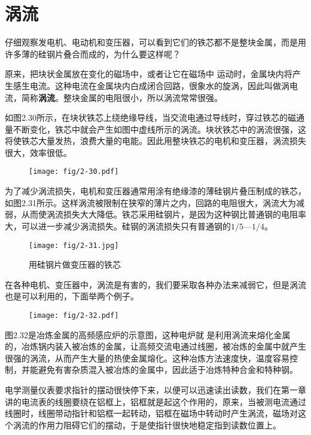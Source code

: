 \section{涡流}

仔细观察发电机、电动机和变压器，可以看到它们的铁芯都不是整块金属，而是用许多薄的硅钢片叠合而成的，为什么要这样呢？

原来，把块状金属放在变化的磁场中，或者让它在磁场中
运动时，金属块内将产生感生电流。这种电流在金属块内白成闭合回路，很象水的旋涡，因此叫做涡电流，简称\textbf{涡流}。整块金属的电阻很小，所以涡流常常很强。

如图2.30所示，在块状铁芯上绕绝缘导线，当交流电通过导线时，穿过铁芯的磁通量不断变化，铁芯中就会产生如图中虚线所示的涡流。块状铁芯中的涡流很强，这将使铁芯大量发热，浪费大量的电能。因此用整块铁芯的电机和变压器，涡流损失很大，效率很低。
\begin{figure}[htp]
    \centering
    \texttt{[image: fig/2-30.pdf]}
    \caption{}
\end{figure}

为了减少涡流损失，电机和变压器通常用涂有绝缘漆的薄硅钢片叠压制成的铁芯，如图2.31所示。这样涡流被限制在狭窄的薄片之内，回路的电阻很大，涡流大为减弱，从而使涡流损失大大降低。铁芯采用硅钢片，是因为这种钢比普通钢的电阻率大，可以进一步减少涡流损失。硅钢的涡流损失只有普通钢的$1/5$—$1/4$。
\begin{figure}[htp]
    \centering
    \texttt{[image: fig/2-31.jpg]}
    \caption{用硅钢片做变压器的铁芯}
\end{figure}

在各种电机、变压器中，涡流是有害的，我们要采取各种办法来减弱它，但是涡流也是可以利用的，下面举两个例子。

\begin{figure}[htp]
    \centering
    \texttt{[image: fig/2-32.pdf]}
    \caption{}
\end{figure}

图2.32是冶炼金属的高频感应炉的示意图，这种电炉就
是利用涡流来熔化金属的，冶炼锅内装入被冶炼的金属，让高频交流电通过线圈，被冶炼的金属中就产生很强的涡流，从而产生大量的热使金属熔化。这种冶炼方法速度快，温度容易控制，并能避免有害杂质混入被冶炼的金属中，因此适于冶炼特种合金和特种钢。

电学测量仪表要求指针的摆动很快停下来，以便可以迅速读出读数，我们在第一章讲的电流表的线圈要绕在铝框上，铝框就是起这个作用的，原来，当被测电流通过线圈时，线圈带动指针和铝框一起转动，铝框在磁场中转动时产生涡流，磁场对这个涡流的作用力阻碍它们的摆动，于是使指针很快地稳定指到读数位置上。

